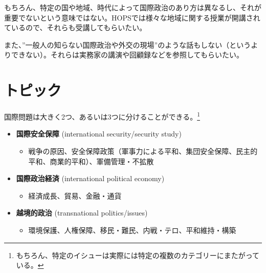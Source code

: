 \documentclass[
  xelatex,
  ja=standard]{bxjsarticle}
\providecommand{\tightlist}{%
  \setlength{\itemsep}{0pt}\setlength{\parskip}{0pt}}\usepackage{longtable,booktabs,array}
\begin{document}
\begin{tcolorbox}[enhanced jigsaw, coltitle=black, rightrule=.15mm, titlerule=0mm, toptitle=1mm, arc=.35mm, colframe=quarto-callout-warning-color-frame, opacityback=0, left=2mm, title=\textcolor{quarto-callout-warning-color}{\faExclamationTriangle}\hspace{0.5em}{地域研究や歴史研究}, colbacktitle=quarto-callout-warning-color!10!white, bottomrule=.15mm, breakable, bottomtitle=1mm, colback=white, leftrule=.75mm, toprule=.15mm, opacitybacktitle=0.6]

もちろん、特定の国や地域、時代によって国際政治のあり方は異なるし、それが重要でないという意味ではない。HOPSでは様々な地域に関する授業が開講されているので、それらも受講してもらいたい。

また、''一般人の知らない国際政治や外交の現場''のような話もしない（というよりできない）。それらは実務家の講演や回顧録などを参照してもらいたい。

\end{tcolorbox}

\hypertarget{ux30c8ux30d4ux30c3ux30af}{%
\section{トピック}\label{ux30c8ux30d4ux30c3ux30af}}

国際問題は大きく2つ、あるいは3つに分けることができる。\footnote{もちろん、特定のイシューは実際には特定の複数のカテゴリーにまたがっている。}

\begin{itemize}
\tightlist
\item
  \textbf{国際安全保障} (international security/security study)

  \begin{itemize}
  \tightlist
  \item
    戦争の原因、安全保障政策（軍事力による平和、集団安全保障、民主的平和、商業的平和）、軍備管理・不拡散
  \end{itemize}
\item
  \textbf{国際政治経済} (international political economy)

  \begin{itemize}
  \tightlist
  \item
    経済成長、貿易、金融・通貨
  \end{itemize}
\item
  \textbf{越境的政治} (transnational politics/issues)

  \begin{itemize}
  \tightlist
  \item
    環境保護、人権保障、移民・難民、内戦・テロ、平和維持・構築
  \end{itemize}
\end{itemize}
\end{document}
